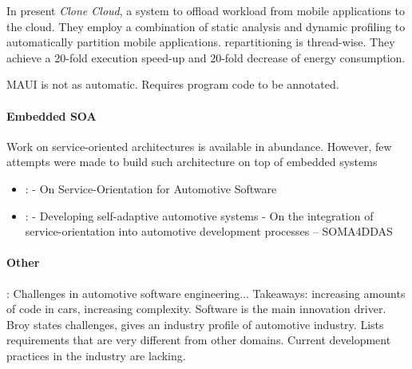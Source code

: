 In \cite{chun2011clonecloud} \citeauthor*{barbera2013offload} present \emph{Clone Cloud}, a system to offload workload from mobile applications to the cloud. They employ a combination of static analysis and dynamic profiling to automatically partition mobile applications. repartitioning is thread-wise. They achieve a 20-fold execution speed-up and 20-fold decrease of energy consumption.

MAUI is not as automatic. Requires program code to be annotated.


\paragraph{Embedded SOA}
Work on service-oriented architectures is available in abundance. However, few attempts were made to build such architecture on top of embedded systems

\begin{itemize}
\item \cite{kugele2017service}: \citeauthor*{kugele2017service} - On Service-Orientation for Automotive Software
\item \cite{wagner2014developing}: \citeauthor*{wagner2014developing} - Developing self-adaptive automotive systems - On the integration of service-orientation into automotive
development processes -- SOMA4DDAS
\end{itemize}





\paragraph{Other}
\citeauthor*{broy2006challenges} \cite{broy2006challenges}: Challenges in automotive software engineering... Takeaways: increasing amounts of code in cars, increasing complexity. Software is the main innovation driver. Broy states challenges, gives an industry profile of automotive industry. Lists requirements that are very different from other domains. Current development practices in the industry are lacking.
